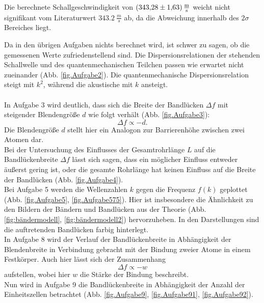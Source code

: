 Die berechnete Schallgeschwindigkeit von $\SI{343.28 \pm 1.63}{\frac{m}{s}}$ weicht nicht signifikant vom Literaturwert $\SI{343.2}{\frac{m}{s}}$ \cite{Physik} ab, da die Abweichung innerhalb des $2 \sigma$ Bereiches liegt.

Da in den übrigen Aufgaben nichts berechnet wird, ist schwer zu sagen, ob die gemessenen Werte zufriedenstellend sind.
Die Dispersionsrelationen der stehenden Schallwelle und des quantenmechanischen Teilchen passen wie erwartet nicht zueinander (Abb. \ref{fig.Aufgabe2}).
Die quantenmechanische Dispersionsrelation steigt mit $k^2$, während die akustische mit $k$ ansteigt.\\
\\In Aufgabe 3 wird deutlich, dass sich die Breite der Bandlücken $\Delta f$ mit steigender Blendengröße $d$ wie folgt verhält (Abb. \ref{fig.Aufgabe3}):
\begin{equation*}
  \Delta f \propto - d.
\end{equation*}
Die Blendengröße $d$ stellt hier ein Analogon zur Barrierenhöhe zwischen zwei Atomen dar.
\\Bei der Untersuchung des Einflusses der Gesamtrohrlänge $L$ auf die Bandlückenbreite $\Delta f$ lässt sich sagen, dass ein möglicher Einfluss entweder äußerst gering ist, oder die gesamte Rohrlänge hat keinen Einfluss auf die Breite der Bandlücken (Abb. \ref{fig.Aufgabe4}).
\\Bei Aufgabe 5 werden die Wellenzahlen $k$ gegen die Frequenz $f(k)$ geplottet (Abb. \ref{fig.Aufgabe5}, \ref{fig.Aufgabe575}).
Hier ist insbesondere die Ähnlichkeit zu den Bildern der Bändern und Bandlücken aus der Theorie (Abb. \ref{fig:bändermodell}, \ref{fig:bändermodell2}) hervorzuheben.
In den Darstellungen sind die auftretenden Bandlücken farbig hinterlegt.
\\In Aufgabe 8 wird der Verlauf der Bandlückenbreite in Abhängigkeit der Blendenbreite in Verbindung gebracht mit der Bindung zweier Atome in einem Festkörper.
Auch hier lässt sich der Zusammenhang
\begin{equation*}
  \Delta f \propto - w
\end{equation*}
aufstellen, wobei hier $w$ die Stärke der Bindung beschreibt.
\\Nun wird in Aufgabe 9 die Bandlückenbreite in Abhängigkeit der Anzahl der Einheitszellen betrachtet (Abb. \ref{fig.Aufgabe9}, \ref{fig.Aufgabe91}, \ref{fig.Aufgabe92}).
